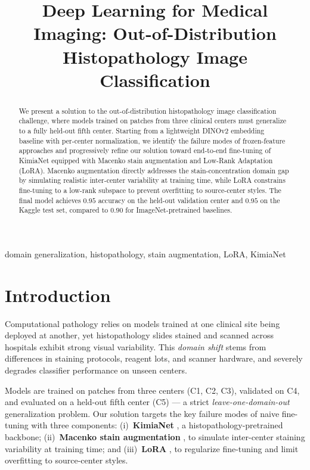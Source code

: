 \documentclass{midl}
\title[DLMI: Kaggle Challenge]{Deep Learning for Medical Imaging: Out-of-Distribution Histopathology Image Classification}
\begin{document}
\maketitle

\begin{abstract}
We present a solution to the out-of-distribution histopathology image classification
challenge, where models trained on patches from three clinical centers must generalize to
a fully held-out fifth center. Starting from a lightweight DINOv2 embedding baseline with
per-center normalization, we identify the failure modes of frozen-feature approaches and
progressively refine our solution toward end-to-end fine-tuning of KimiaNet equipped with Macenko stain augmentation and Low-Rank Adaptation (LoRA). Macenko augmentation directly addresses the stain-concentration
domain gap by simulating realistic inter-center variability at training time, while LoRA
constrains fine-tuning to a low-rank subspace to prevent overfitting to source-center
styles. The final model achieves $0.95$ accuracy on the held-out validation center and
$0.95$ on the Kaggle test set, compared to $0.90$ for ImageNet-pretrained baselines.
\end{abstract}

\begin{keywords}
domain generalization, histopathology, stain augmentation, LoRA, KimiaNet
\end{keywords}

\section{Introduction}

Computational pathology relies on models trained at one clinical site being deployed at
another, yet histopathology slides stained and scanned across hospitals exhibit strong
visual variability. This \emph{domain shift} stems from differences in staining protocols,
reagent lots, and scanner hardware, and severely degrades classifier performance on unseen
centers.

Models are trained on patches from three centers (C1, C2, C3), validated on C4, and
evaluated on a held-out fifth center (C5) — a strict \emph{leave-one-domain-out}
generalization problem. Our solution targets the key failure modes of naive fine-tuning
with three components: (i)~\textbf{KimiaNet} \citep{kimianet2021}, a histopathology-pretrained
backbone; (ii)~\textbf{Macenko stain augmentation} \citep{macenko2009}, to simulate
inter-center staining variability at training time; and (iii)~\textbf{LoRA}
\citep{hu2022lora}, to regularize fine-tuning and limit overfitting to source-center styles.
\end{document}
